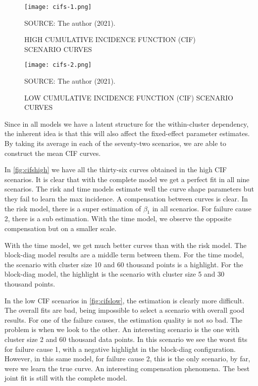 \begin{figure}[H]
 \setlength{\abovecaptionskip}{.0001pt}
 \caption{HIGH CUMULATIVE INCIDENCE FUNCTION (CIF) SCENARIO CURVES}
 \vspace{0.2cm}\centering
 \texttt{[image: cifs-1.png]}\\
 \begin{footnotesize}
  SOURCE: The author (2021).
 \end{footnotesize}
 \label{fig:cifshigh}
\end{figure}

\begin{figure}[H]
 \setlength{\abovecaptionskip}{.0001pt}
 \caption{LOW CUMULATIVE INCIDENCE FUNCTION (CIF) SCENARIO CURVES}
 \vspace{0.2cm}\centering
 \texttt{[image: cifs-2.png]}\\
 \begin{footnotesize}
  SOURCE: The author (2021).
 \end{footnotesize}
 \label{fig:cifslow}
\end{figure}

Since in all models we have a latent structure for the within-cluster
dependency, the inherent idea is that this will also affect the
fixed-effect parameter estimates. By taking its average in each of the
seventy-two scenarios, we are able to construct the mean CIF curves.

In \autoref{fig:cifshigh} we have all the thirty-six curves obtained in
the high CIF scenarios. It is clear that with the complete model we get
a perfect fit in all nine scenarios. The risk and time models estimate
well the curve shape parameters but they fail to learn the max
incidence. A compensation between curves is clear. In the risk model,
there is a super estimation of \(\beta_{1}\) in all scenarios. For
failure cause 2, there is a sub estimation. With the time model, we
observe the opposite compensation but on a smaller scale.

With the time model, we get much better curves than with the risk
model. The block-diag model results are a middle term between them. For
the time model, the scenario with cluster size 10 and 60 thousand points
is a highlight. For the block-diag model, the highlight is the scenario
with cluster size 5 and 30 thousand points.

In the low CIF scenarios in \autoref{fig:cifslow}, the estimation is
clearly more difficult. The overall fits are bad, being impossible to
select a scenario with overall good results. For one of the failure
causes, the estimation quality is not so bad. The problem is when we
look to the other. An interesting scenario is the one with cluster size
2 and 60 thousand data points. In this scenario we see the worst fits
for failure cause 1, with a negative highlight in the block-diag
configuration. However, in this same model, for failure cause 2, this is
the only scenario, by far, were we learn the true curve. An interesting
compensation phenomena. The best joint fit is still with the complete
model.

